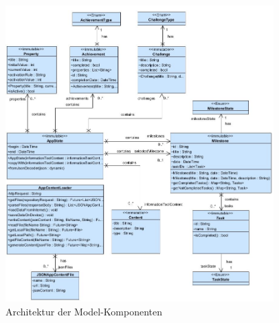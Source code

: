\documentclass[bibliography=totoc,listof=totoc,BCOR=5mm,DIV=12,oneside]{scrbook}
\begin{document}
\bigskip
\begin{figure}[H]
	\centering
	\includegraphics[width=0.92\textwidth,keepaspectratio]{Bilder/ModelClass.JPG}
	\caption{Architektur der Model-Komponenten}
	\label{img:architectureOverview}
\end{figure}
\end{document}
